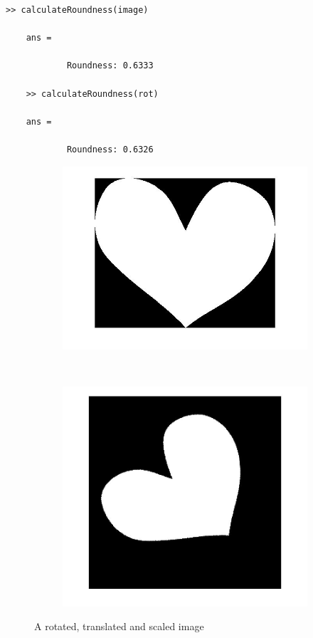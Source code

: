 \documentclass[a4paper,psfig,subfigure,epsfig,fleqn,amssmb,float,caption,fontenc,ausarbeitung]{article}
\begin{document}
\begin{lstlisting}[caption=Calculate roundness in matlab, label=lst:roundness]
	>> calculateRoundness(image)

	ans = 

			Roundness: 0.6333
	
	>> calculateRoundness(rot)

	ans = 

			Roundness: 0.6326
\end{lstlisting}

\begin{figure}
	\centering
	\begin{subfigure}[b]{0.4\textwidth}
		\includegraphics[width=\textwidth]{img/heart.jpg}
	\end{subfigure}
	~ 
	\begin{subfigure}[b]{0.4\textwidth}
		\includegraphics[width=\textwidth]{img/invariance_rotation.jpg}
	\end{subfigure}
	\caption{A rotated, translated and scaled image}
	\label{fig:heart}
\end{figure}
\end{document}
